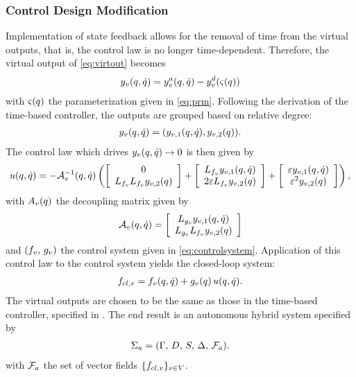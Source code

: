 \subsubsection{Control Design Modification}

Implementation of state feedback allows for the removal of time from the virtual
outputs, that is, the control law is no longer time-dependent.
%
Therefore, the virtual output of \eqref{eq:virtout} becomes
\begin{align*}
  y_{v}(q, \dot{q}) = y_{v}^a(q, \dot{q}) - y_{v}^{d}(\varsigma(q))
\end{align*}
with $\varsigma(q)$ the parameterization given in \eqref{eq:prm}.
%
Following the derivation of the time-based controller, the outputs are grouped
based on relative degree:
%
\begin{align*}
  y_{v}(q, \dot{q}) = (y_{v,1}(q, \dot{q}), y_{v,2}(q)).
\end{align*}
%
The control law which drives $y_{v}(q, \dot{q}) \to 0$ is then given by
\begin{align*}
  u(q, \dot{q}) = -\mathcal{A}_{v}^{-1}(q, \dot{q}) \left(
  \left[ \begin{array}{c}
      0\\
      L_{f_{v}} L_{f_{v}} y_{v,2}(q)
    \end{array} \right] +
  \left[ \begin{array}{c}
      L_{f_{v}} y_{v,1}(q, \dot{q})\\
      2 \varepsilon L_{f_{v}} y_{v,2}(q)
    \end{array} \right] +
  \left[ \begin{array}{c}
      \varepsilon y_{v,1}(q, \dot{q})\\
      \varepsilon^2 y_{v,2}(q)
    \end{array} \right]\right),
\end{align*}
with $A_{v}(q)$ the decoupling matrix given by
\begin{align}
  \mathcal{A}_{v}(q, \dot{q}) =
  \left[\begin{array}{c}
      L_{g_{v}} y_{v,1} (q, \dot{q})\\
      L_{g_{v}} L_{f_{v}} y_{{v},2}(q)
    \end{array}\right]
\end{align}
and $(f_{v}, \, g_{v})$ the control system given in
\eqref{eq:controlsystem}.
%
Application of this control law to the control system yields the closed-loop
system:
%
\begin{align}
  f_{cl,v} = f_{v}(q, \dot{q}) + g_{v}(q) \, u(q, \dot{q}).
\end{align}
%
The virtual outputs are chosen to be the same as those in the time-based
controller, specified in .
%
The end result is an autonomous hybrid system specified by
\begin{align}
  \Sigma_{a} = (\Gamma, \, D, \, S, \, \Delta, \, \mathcal{F}_{a}).
\end{align}
with $\mathcal{F}_{a}$ the set of vector fields $\{f_{cl,v}\}_{v \in V}$.


